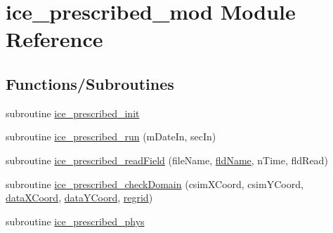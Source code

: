\hypertarget{namespaceice__prescribed__mod}{
\section{ice\_\-prescribed\_\-mod Module Reference}
\label{namespaceice__prescribed__mod}
}
\subsection*{Functions/Subroutines}
\begin{DoxyCompactItemize}
\item 
subroutine \hyperlink{namespaceice__prescribed__mod_a653502aece9eed08846385d30fec703b}{ice\_\-prescribed\_\-init}
\item 
subroutine \hyperlink{namespaceice__prescribed__mod_a73bcaa2e547c18a24eeabaa2e22e8fe9}{ice\_\-prescribed\_\-run} (mDateIn, secIn)
\item 
subroutine \hyperlink{namespaceice__prescribed__mod_aa67a3710c35bda9e15dedf703582f149}{ice\_\-prescribed\_\-readField} (fileName, \hyperlink{namespaceice__prescribed__mod_a47d61c09a57e43eefae7895db766851a}{fldName}, nTime, fldRead)
\item 
subroutine \hyperlink{namespaceice__prescribed__mod_acc7d1e7dfe5627bee722781e039280c9}{ice\_\-prescribed\_\-checkDomain} (csimXCoord, csimYCoord, \hyperlink{namespaceice__prescribed__mod_a05759838d18f2fbc703a6ff43bdc217b}{dataXCoord}, \hyperlink{namespaceice__prescribed__mod_abf3b4ab489983d1531847794139e9397}{dataYCoord}, \hyperlink{namespaceice__prescribed__mod_a794e5c02618e82554dc2cec6c635b8f1}{regrid})
\item 
subroutine \hyperlink{namespaceice__prescribed__mod_a9e6ac38b742040541c97492d74282b7a}{ice\_\-prescribed\_\-phys}
\end{DoxyCompactItemize}
